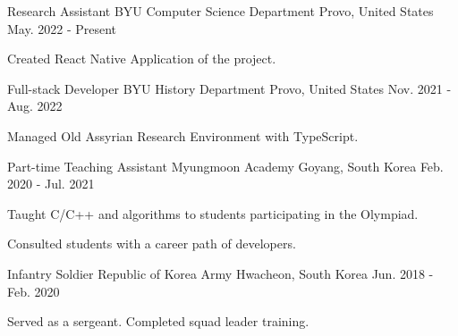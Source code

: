 

\begin{cventries}

  \cventry
  {Research Assistant} %
  {BYU Computer Science Department} %
  {Provo, United States} %
  {May. 2022 - Present} %
  {
    \begin{cvitems} %
      \item {Created React Native Application of the project.}
    \end{cvitems}
  }

  \cventry
  {Full-stack Developer} %
  {BYU History Department} %
  {Provo, United States} %
  {Nov. 2021 - Aug. 2022} %
  {
    \begin{cvitems} %
      \item {Managed Old Assyrian Research Environment with TypeScript.}
    \end{cvitems}
  }

  \cventry
  {Part-time Teaching Assistant} %
  {Myungmoon Academy} %
  {Goyang, South Korea} %
  {Feb. 2020 - Jul. 2021} %
  {
    \begin{cvitems} %
      \item {Taught C/C++ and algorithms to students participating in the Olympiad.}
      \item {Consulted students with a career path of developers.}
    \end{cvitems}
  }

  \cventry
  {Infantry Soldier} %
  {Republic of Korea Army} %
  {Hwacheon, South Korea} %
  {Jun. 2018 - Feb. 2020} %
  {
    \begin{cvitems} %
      \item {Served as a sergeant. Completed squad leader training.}
    \end{cvitems}
  }

\end{cventries}
